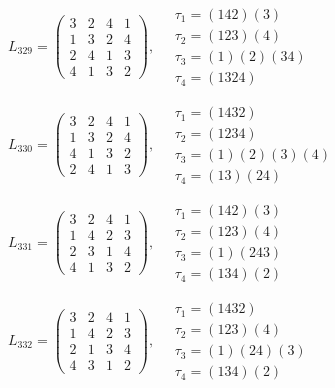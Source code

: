 $L_{329} = \begin{pmatrix} 3 & 2 & 4 & 1 \\ 1 & 3 & 2 & 4 \\ 2 & 4 & 1 & 3 \\ 4 & 1 & 3 & 2 \end{pmatrix}, \quad \begin{matrix} \tau_{1} = (1 4 2)(3) \\ \tau_{2} = (1 2 3)(4) \\ \tau_{3} = (1)(2)(3 4) \\ \tau_{4} = (1 3 2 4) \end{matrix}$

$L_{330} = \begin{pmatrix} 3 & 2 & 4 & 1 \\ 1 & 3 & 2 & 4 \\ 4 & 1 & 3 & 2 \\ 2 & 4 & 1 & 3 \end{pmatrix}, \quad \begin{matrix} \tau_{1} = (1 4 3 2) \\ \tau_{2} = (1 2 3 4) \\ \tau_{3} = (1)(2)(3)(4) \\ \tau_{4} = (1 3)(2 4) \end{matrix}$

$L_{331} = \begin{pmatrix} 3 & 2 & 4 & 1 \\ 1 & 4 & 2 & 3 \\ 2 & 3 & 1 & 4 \\ 4 & 1 & 3 & 2 \end{pmatrix}, \quad \begin{matrix} \tau_{1} = (1 4 2)(3) \\ \tau_{2} = (1 2 3)(4) \\ \tau_{3} = (1)(2 4 3) \\ \tau_{4} = (1 3 4)(2) \end{matrix}$

$L_{332} = \begin{pmatrix} 3 & 2 & 4 & 1 \\ 1 & 4 & 2 & 3 \\ 2 & 1 & 3 & 4 \\ 4 & 3 & 1 & 2 \end{pmatrix}, \quad \begin{matrix} \tau_{1} = (1 4 3 2) \\ \tau_{2} = (1 2 3)(4) \\ \tau_{3} = (1)(2 4)(3) \\ \tau_{4} = (1 3 4)(2) \end{matrix}$

